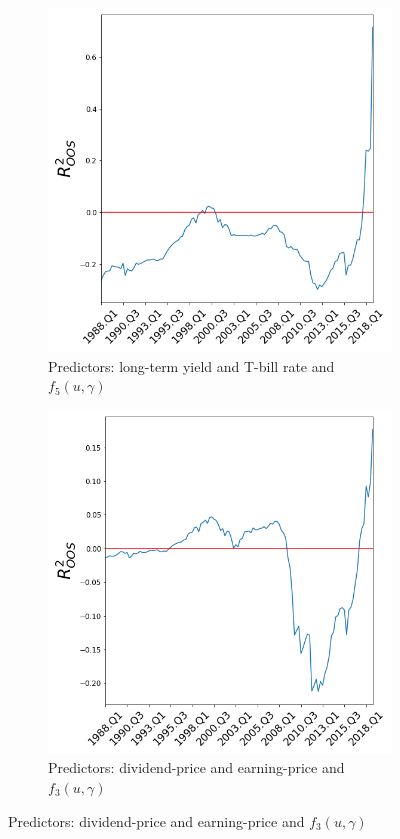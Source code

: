 \documentclass[a4paper,12pt,times,numbered,print,index]{report}
\numberwithin{equation}{section}
\begin{document}
\begin{figure}[H]
		\medskip
		\begin{subfigure}{0.48\textwidth}
			\captionsetup{justification=centering}
			\includegraphics[width=0.8\linewidth]{plots/co2f5.png}
			\caption{Predictors: long-term yield and T-bill rate and $f_{5}( u,\gamma)$ } \label{co2f5}
		\end{subfigure}\hspace*{\fill}
		\begin{subfigure}{0.48\textwidth}
			\captionsetup{justification=centering}
			\includegraphics[width=0.8\linewidth]{plots/co1f3.png}
			\caption{Predictors: dividend-price and earning-price and $f_{3}( u,\gamma)$ } \label{co1f3}
		\end{subfigure}
		

\end{figure}
\end{document}
